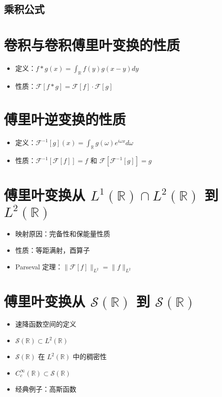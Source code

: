\documentclass[12pt,a4paper]{article}
\begin{document}
	
	\subsection{乘积公式}

	

	
	\section{卷积与卷积傅里叶变换的性质}
	\begin{itemize}
		\item 定义：\(f * g(x) = \int_{\mathbb{R}} f(y)g(x - y) dy\)
		\item 性质：\(\mathcal{F}[f * g] = \mathcal{F}[f] \cdot \mathcal{F}[g]\)
	\end{itemize}
	
	\section{傅里叶逆变换的性质}
	\begin{itemize}
		\item 定义：\(\mathcal{F}^{-1}[g](x) = \int_{\mathbb{R}} g(\omega) e^{i\omega x} d\omega\)
		\item 性质：\(\mathcal{F}^{-1}[\mathcal{F}[f]] = f\) 和 \(\mathcal{F}[\mathcal{F}^{-1}[g]] = g\)
	\end{itemize}
	
	\section{傅里叶变换从 \(L^1(\mathbb{R}) \cap L^2(\mathbb{R})\) 到 \(L^2(\mathbb{R})\)}
	\begin{itemize}
		\item 映射原因：完备性和保能量性质
		\item 性质：等距满射，酉算子
		\item Parseval 定理：\(\|\mathcal{F}[f]\|_{L^2} = \|f\|_{L^2}\)
	\end{itemize}
	
	\section{傅里叶变换从 \(\mathcal{S}(\mathbb{R})\) 到 \(\mathcal{S}(\mathbb{R})\)}
	\begin{itemize}
		\item 速降函数空间的定义
		\item \(\mathcal{S}(\mathbb{R}) \subset L^2(\mathbb{R})\)
		\item \(\mathcal{S}(\mathbb{R})\) 在 \(L^2(\mathbb{R})\) 中的稠密性
		\item \(C_c^\infty(\mathbb{R}) \subset \mathcal{S}(\mathbb{R})\)
		\item 经典例子：高斯函数
	\end{itemize}
	
\end{document}
